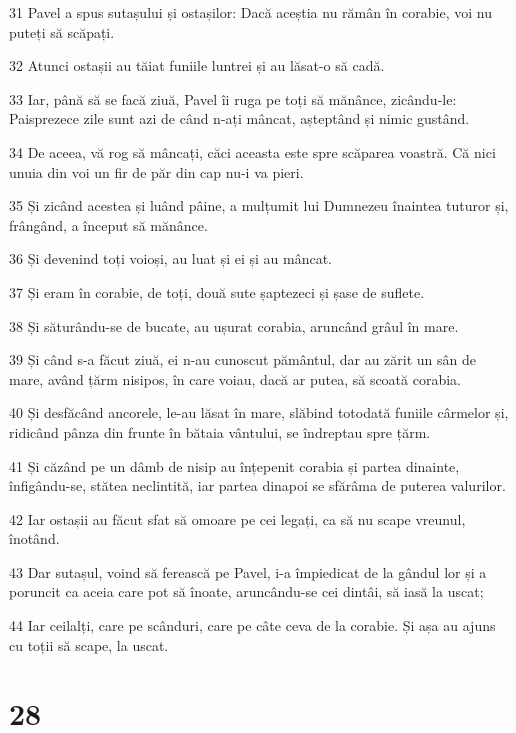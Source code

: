 \par 31 Pavel a spus sutașului și ostașilor: Dacă aceștia nu rămân în corabie, voi nu puteți să scăpați.
\par 32 Atunci ostașii au tăiat funiile luntrei și au lăsat-o să cadă.
\par 33 Iar, până să se facă ziuă, Pavel îi ruga pe toți să mănânce, zicându-le: Paisprezece zile sunt azi de când n-ați mâncat, așteptând și nimic gustând.
\par 34 De aceea, vă rog să mâncați, căci aceasta este spre scăparea voastră. Că nici unuia din voi un fir de păr din cap nu-i va pieri.
\par 35 Și zicând acestea și luând pâine, a mulțumit lui Dumnezeu înaintea tuturor și, frângând, a început să mănânce.
\par 36 Și devenind toți voioși, au luat și ei și au mâncat.
\par 37 Și eram în corabie, de toți, două sute șaptezeci și șase de suflete.
\par 38 Și săturându-se de bucate, au ușurat corabia, aruncând grâul în mare.
\par 39 Și când s-a făcut ziuă, ei n-au cunoscut pământul, dar au zărit un sân de mare, având țărm nisipos, în care voiau, dacă ar putea, să scoată corabia.
\par 40 Și desfăcând ancorele, le-au lăsat în mare, slăbind totodată funiile cârmelor și, ridicând pânza din frunte în bătaia vântului, se îndreptau spre țărm.
\par 41 Și căzând pe un dâmb de nisip au înțepenit corabia și partea dinainte, înfigându-se, stătea neclintită, iar partea dinapoi se sfărâma de puterea valurilor.
\par 42 Iar ostașii au făcut sfat să omoare pe cei legați, ca să nu scape vreunul, înotând.
\par 43 Dar sutașul, voind să ferească pe Pavel, i-a împiedicat de la gândul lor și a poruncit ca aceia care pot să înoate, aruncându-se cei dintâi, să iasă la uscat;
\par 44 Iar ceilalți, care pe scânduri, care pe câte ceva de la corabie. Și așa au ajuns cu toții să scape, la uscat.

\chapter{28}

